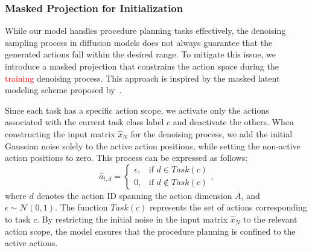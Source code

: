 \subsubsection{Masked Projection for Initialization}
\label{method22}

While our model handles procedure planning tasks effectively, the denoising sampling process in diffusion models does not always guarantee that the generated actions fall within the desired range. To mitigate this issue, we introduce a masked projection that constrains the action space during the \textcolor{red}{training} denoising process. This approach is inspired by the masked latent modeling scheme proposed by~\citet{gao2023masked}.

Since each task has a specific action scope, we activate only the actions associated with the current task class label $c$ and deactivate the others. When constructing the input matrix $\hat{x}_N$ for the denoising process, we add the initial Gaussian noise solely to the active action positions, while setting the non-active action positions to zero. This process can be expressed as follows:
\begin{equation}
\hat{a}_{t,d} = 
\begin{cases} 
      \epsilon, & \text{if } d \in Task(c) \\
      0, & \text{if } d \notin Task(c)
\end{cases},
\end{equation}
where $d$ denotes the action ID spanning the action dimension $A$, and $\epsilon \sim \mathcal{N}(0,1)$. The function $Task(c)$ represents the set of actions corresponding to task $c$. By restricting the initial noise in the input matrix $\hat{x}_N$ to the relevant action scope, the model ensures that the procedure planning is confined to the active actions.

